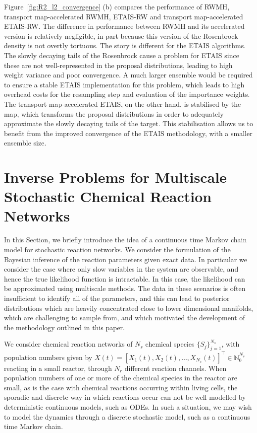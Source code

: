 \documentclass[final]{siamltex}
\newcommand{\edit}[1]{{\color{red} #1}}
\begin{document}
Figure~\ref{fig:R2_l2_convergence} (b) compares the performance of
RWMH, transport map-accelerated RWMH, ETAIS-RW and transport
map-accelerated ETAIS-RW. The difference in performance between RWMH
and its accelerated version is relatively negligible, in part because
this version of the Rosenbrock density is not overtly tortuous. The story
is different for the ETAIS algorithms. The slowly decaying tails of
the Rosenbrock cause a problem for ETAIS since these are not
well-represented in the proposal distributions, leading to high weight
variance and poor convergence. A much larger
ensemble would be required to ensure a stable ETAIS implementation for this
problem, which leads to high overhead costs for the resampling step
and evaluation of the importance weights. The transport map-accelerated
ETAIS, on the other hand, is stabilised by the map, which transforms the proposal
distributions in order to adequately approximate the slowly decaying
tails of the target. This stabilisation allows us to benefit from the
improved convergence of the ETAIS methodology, with a smaller ensemble
size. 



\section{Inverse Problems for Multiscale Stochastic Chemical Reaction
  Networks}\label{sec:multi}
\edit{In this Section, we briefly introduce the idea of a continuous
  time Markov chain model for stochastic reaction networks. We consider the formulation of the Bayesian inference of
  the reaction parameters given exact data. In particular we consider
  the case where only slow variables in the system are observable, and
  hence the true likelihood function is intractable. In this case, the
  likelihood can be approximated using multiscale methods. The data in
  these scenarios is often insufficient to identify all of the
  parameters, and this can lead to posterior distributions which are
  heavily concentrated close to lower dimensional manifolds, which are
  challenging to sample from, and which motivated the development of
  the methodology outlined in this paper.}

We consider chemical reaction networks of $N_s$ chemical species $\{S_j\}_{j=1}^{N_s}$,
with population numbers given by $X(t) = [X_1(t), X_2(t), \ldots, X_{N_s}(t)]^\top \in
\mathbb{N}_0^{N_s}$ reacting in a small reactor, through $N_r$ different reaction
channels. When population numbers of one or more of the chemical
species in the reactor are small, as is the case with chemical
reactions occurring within living cells, the sporadic and discrete way
in which reactions occur can not be well modelled by deterministic
continuous models, such as ODEs. In such a situation, we may wish to
model the dynamics through a discrete stochastic model, such as a
continuous time Markov chain.
\end{document}
